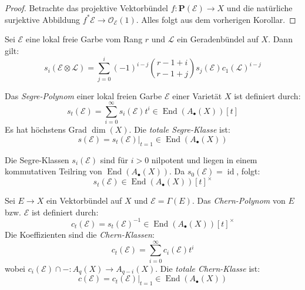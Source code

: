 \documentclass[10pt,a4paper]{article}
\begin{document}
\begin{proof}
Betrachte das projektive Vektorbündel $f: \mathbf{P}(\mathcal{E})\to X$ und die natürliche surjektive Abbildung $f^\ast\mathcal{E}\to\mathcal{O}_\mathcal{E}(1)$. Alles folgt aus dem vorherigen Korollar.
\end{proof}

\begin{proposition}
Sei $\mathcal{E}$ eine lokal freie Garbe vom Rang $r$ und $\mathcal{L}$ ein Geradenbündel auf $X$. Dann gilt:
\[ s_i(\mathcal{E}\otimes\mathcal{L}) = \sum_{j=0}^i(-1)^{i-j} \binom{r-1+i}{r-1+j}s_j(\mathcal{E}) c_1(\mathcal{L})^{i-j} \]
\end{proposition}

\begin{definition}
Das \textit{Segre-Polynom} einer lokal freien Garbe $\mathcal{E}$ einer Varietät $X$ ist definiert durch:
\[ s_t(\mathcal{E}) = \sum_{i = 0}^\infty s_i(\mathcal{E})t^i \in\operatorname{End}(A_\bullet(X))[t] \]
Es hat höchstens Grad $\dim(X)$. Die \textit{totale Segre-Klasse} ist:
\[ s(\mathcal{E}) = s_t(\mathcal{E})|_{t = 1} \in\operatorname{End}(A_\bullet(X)) \]
\end{definition}

\begin{remark}
Die Segre-Klassen $s_i(\mathcal{E})$ sind für $i>0$  nilpotent und liegen in einem kommutativen Teilring von $\operatorname{End}(A_\bullet(X))$. Da $s_0(\mathcal{E}) = \operatorname{id}$, folgt:
\[ s_t(\mathcal{E}) \in\operatorname{End}(A_\bullet(X))[t]^\times \]
\end{remark}

\begin{definition}
Sei $E\to X$ ein Vektorbündel auf $X$ und $\mathcal{E} = \Gamma(E)$. Das \textit{Chern-Polynom} von $E$ bzw. $\mathcal{E}$ ist definiert durch:
\[ c_t(\mathcal{E}) = s_t(\mathcal{E})^{-1} \in\operatorname{End}(A_\bullet(X))[t]^\times \]
Die Koeffizienten sind die \textit{Chern-Klassen}:   
\[ c_t(\mathcal{E}) = \sum_{i =0}^\infty c_i(\mathcal{E}) t^i \]
wobei $c_i(\mathcal{E})\cap - : A_q(X)\to A_{q-i}(X)$. Die \textit{totale Chern-Klasse} ist:
\[ c(\mathcal{E}) = c_t(\mathcal{E})|_{t =1}\in\operatorname{End}(A_\bullet(X)) \]
\end{definition}
\end{document}
